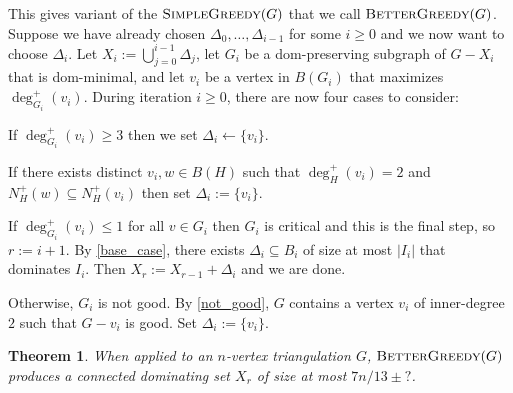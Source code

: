 \documentclass[12pt]{article}
\newtheorem{thm}{Theorem}
\begin{document}
This gives variant of the $\textsc{SimpleGreedy}(G)$ that we call $\textsc{BetterGreedy}(G)$.  Suppose we have already chosen $\Delta_0,\ldots,\Delta_{i-1}$ for some $i\ge 0$ and we now want to choose $\Delta_i$.  Let $X_i:=\bigcup_{j=0}^{i-1}\Delta_j$, let $G_i$ be a dom-preserving subgraph of $G-X_i$ that is dom-minimal, and let $v_i$ be a vertex in $B(G_i)$ that maximizes $\deg^+_{G_i}(v_i)$.  During iteration $i\ge 0$, there are now four cases to consider:
\begin{compactenum}
    \item If $\deg^+_{G_i}(v_i)\ge 3$ then we set $\Delta_i\gets\{v_i\}$.
    \item If there exists distinct $v_i,w\in B(H)$ such that $\deg^+_H(v_i)=2$ and $N^+_H(w)\subseteq N^+_H(v_i)$ then set $\Delta_i:=\{v_i\}$.
    \item If $\deg^+_{G_i}(v_i)\le 1$ for all $v\in G_i$ then $G_i$ is critical and this is the final step, so $r:=i+1$.  By \cref{base_case}, there exists $\Delta_i\subseteq B_i$ of size at most $|I_i|$ that dominates $I_i$. Then $X_r:=X_{r-1}+\Delta_{i}$ and we are done.
    \item Otherwise, $G_i$ is not good.  By \cref{not_good}, $G$ contains a vertex $v_i$ of inner-degree $2$ such that $G-v_i$ is good.  Set $\Delta_i:=\{v_i\}$.
\end{compactenum}

\begin{thm}\label{better_greedy}
  When applied to an $n$-vertex triangulation $G$,  $\textsc{BetterGreedy}(G)$ produces a connected dominating set $X_r$ of size at most $7n/13\pm{?}$.
\end{thm}
\end{document}
